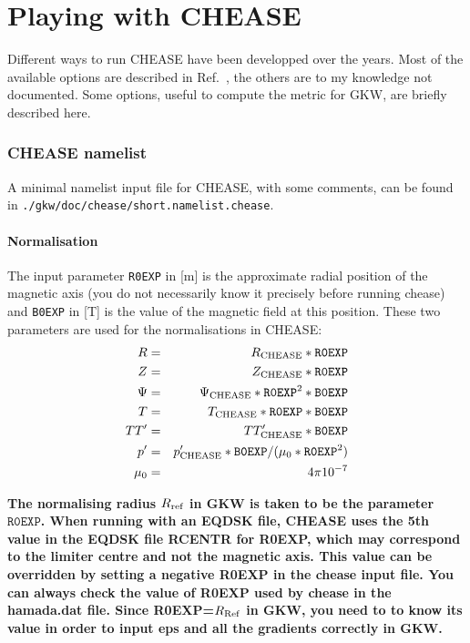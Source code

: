 \documentclass[a4paper,12pt]{article}
\newcommand{\ind}[1]{\ensuremath{_{\rm{#1}}}}
\begin{document}
\part*{Playing with CHEASE}
Different ways to run CHEASE have been developped over the years. Most of the available options are described in Ref.~\cite{Lutjens:Comput1996}, the others are to my knowledge not documented. Some options, useful to compute the metric for GKW, are briefly described here.

\section{CHEASE namelist}

A minimal namelist input file for CHEASE, with some comments, can be found in \texttt{./gkw/doc/chease/short.namelist.chease}.

\subsection{Normalisation}
The input parameter \texttt{R0EXP} in [m] is the approximate radial position of the magnetic axis (you do not necessarily know it precisely before running chease) and \texttt{B0EXP} in [T] is the value of the magnetic field at this position. These two parameters are used for the normalisations in CHEASE:
\begin{eqnarray*}
 R &=& R\ind{CHEASE} * \texttt{R0EXP}\\
 Z &=& Z\ind{CHEASE} * \texttt{R0EXP}\\
 \Psi &=& \Psi\ind{CHEASE} * \texttt{R0EXP}^2 * \texttt{B0EXP}\\
 T &=& T\ind{CHEASE} * \texttt{R0EXP} * \texttt{B0EXP}\\
 TT' &=& TT'\ind{CHEASE} * \texttt{B0EXP}\\
 p' &=& p'\ind{CHEASE} * \texttt{B0EXP}/(\mu_0*\texttt{R0EXP}^2)\\
 \mu_0 &=& 4\pi 10^{-7}
\end{eqnarray*}

\textbf{The normalising radius $R\ind{ref}$ in GKW is taken to be the parameter $\texttt{R0EXP}$.  When running with an EQDSK file, CHEASE uses the 5th value in the EQDSK file RCENTR for R0EXP, which may correspond to the limiter centre and not the magnetic axis.  This value can be overridden by setting a negative R0EXP in the chease input file.  You can always check the value of R0EXP used by chease in the hamada.dat file.  Since R0EXP=$R_{\rm Ref}$ in GKW, you need to to know its value in order to input eps and all the gradients correctly in GKW.}
\end{document}
